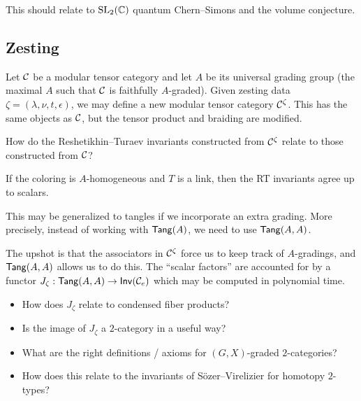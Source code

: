 \documentclass{amsart}
\begin{document}
This should relate to $\mathrm{SL}_2(\mathbb{C})$ quantum Chern--Simons and the volume conjecture.

\subsection{Zesting}

Let $\mathcal{C}$ be a modular tensor category and let $A$ be its universal grading group (the maximal $A$ such that $\mathcal{C}$ is faithfully $A$-graded).
Given zesting data $\zeta = (\lambda, \nu, t, \epsilon)$, we may define a new modular tensor category $\mathcal{C}^\zeta$.
This has the same objects as $\mathcal{C}$, but the tensor product and braiding are modified.

\begin{qn}
  How do the Reshetikhin--Turaev invariants constructed from $\mathcal{C}^\zeta$ relate to those constructed from $\mathcal{C}$?
\end{qn}

\begin{thm}
  If the coloring is $A$-homogeneous and $T$ is a link, then the RT invariants agree up to scalars.
\end{thm}

\begin{thm}[Delaney--MS]
  This may be generalized to tangles if we incorporate an extra grading.
  More precisely, instead of working with $\operatorname{\mathsf{Tang}}(A)$, we need to use $\operatorname{\mathsf{Tang}}(A, A)$.
\end{thm}

The upshot is that the associators in $\mathcal{C}^\zeta$ force us to keep track of $A$-gradings, and $\operatorname{\mathsf{Tang}}(A, A)$ allows us to do this.
The ``scalar factors'' are accounted for by a functor $J_\zeta: \operatorname{\mathsf{Tang}}(A, A) \to \operatorname{\mathsf{Inv}}(\mathcal{C}_e)$ which may be computed in polynomial time.

\begin{qn}
  \begin{itemize}
    \item How does $J_\zeta$ relate to condensed fiber products?
    \item Is the image of $J_\zeta$ a $2$-category in a useful way?
    \item What are the right definitions / axioms for $(G, X)$-graded $2$-categories?
    \item How does this relate to the invariants of S\"ozer--Virelizier for homotopy $2$-types?
  \end{itemize}
\end{qn}
\end{document}
